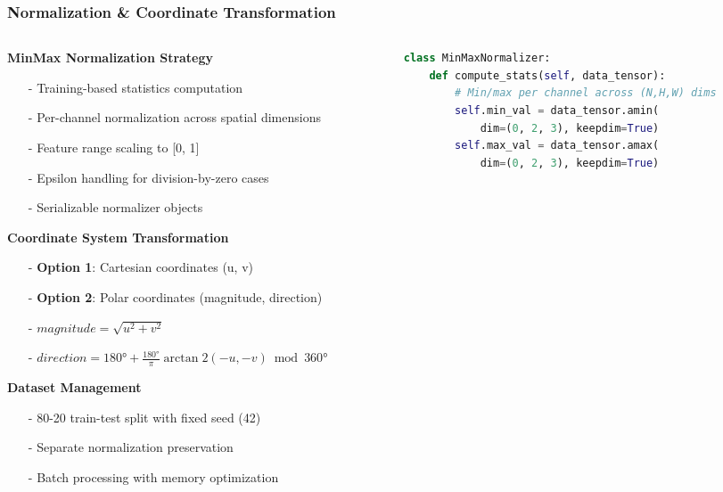 \documentclass[footline=authortitle]{beamer}
\begin{document}
\begin{frame}[fragile]
\frametitle{Normalization \& Coordinate Transformation}

\tiny
\begin{columns}
\begin{column}{0.4\textwidth}
\textbf{MinMax Normalization Strategy}
\begin{itemize}
    \item[-] Training-based statistics computation
    \item[-] Per-channel normalization across spatial dimensions
    \item[-] Feature range scaling to [0, 1]
    \item[-] Epsilon handling for division-by-zero cases
    \item[-] Serializable normalizer objects
\end{itemize}

\vspace{0.3cm}

\textbf{Coordinate System Transformation}
\begin{itemize}
    \item[-] \textbf{Option 1}: Cartesian coordinates (u, v)
    \item[-] \textbf{Option 2}: Polar coordinates (magnitude, direction)
    \item[-] $magnitude = \sqrt{u^2 + v^2}$
    \item[-] $direction = 180° + \frac{180°}{\pi} \arctan2(-u, -v) \bmod 360°$
\end{itemize}

\vspace{0.3cm}

\textbf{Dataset Management}
\begin{itemize}
    \item[-] 80-20 train-test split with fixed seed (42)
    \item[-] Separate normalization preservation
    \item[-] Batch processing with memory optimization
\end{itemize}
\end{column}

\begin{column}{0.6\textwidth}

\begin{lstlisting}[language=Python, basicstyle=\ttfamily\tiny]
class MinMaxNormalizer:
    def compute_stats(self, data_tensor):
        # Min/max per channel across (N,H,W) dims
        self.min_val = data_tensor.amin(
            dim=(0, 2, 3), keepdim=True)
        self.max_val = data_tensor.amax(
            dim=(0, 2, 3), keepdim=True)
        

\end{lstlisting}
\end{column}
\end{columns}
\end{frame}
\end{document}
